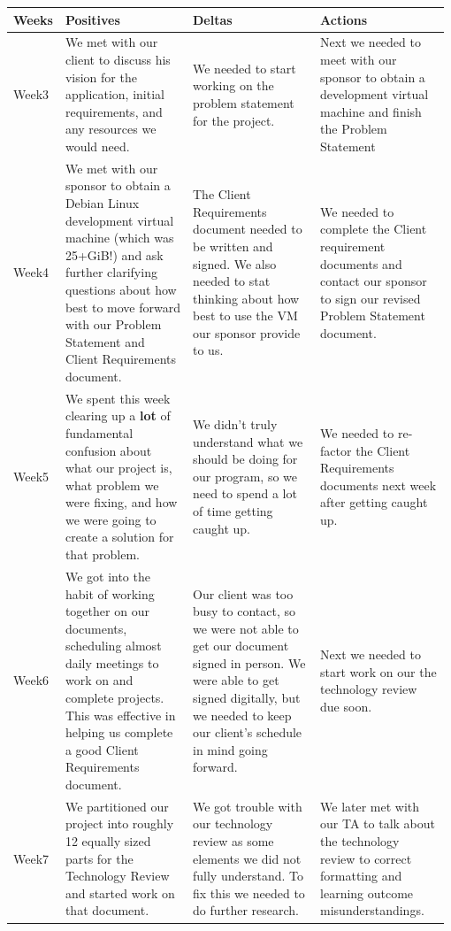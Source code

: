 \begin{longtable}{ | p{0.075\linewidth} | p{0.3\linewidth} | p{0.3\linewidth} | p{0.3\linewidth} |} \hline
  Weeks & Positives & Deltas & Actions \\ \hline
  	Week3 &
    We met with our client to discuss his vision for the application, initial requirements, and any resources we would need. &
    We needed to start working on the problem statement for the project. &
    Next we needed to meet with our sponsor to obtain a development virtual machine and finish the Problem Statement \\
  \hline
  	Week4 &
    We met with our sponsor to obtain a Debian Linux development virtual machine (which was 25+GiB!) and ask further clarifying questions about how best to move forward with our Problem Statement and Client Requirements document. &
    The Client Requirements document needed to be written and signed. We also needed to stat thinking about how best to use the VM our sponsor provide to us. &
    We needed to complete the Client requirement documents and contact our sponsor to sign our revised Problem Statement document.\\
  \hline
  	Week5 &
    We spent this week clearing up a \textbf{lot} of fundamental confusion about what our project is, what problem we were fixing, and how we were going to create a solution for that problem. &
    We didn't truly understand what we should be doing for our program, so we need to spend a lot of time getting caught up. &
    We needed to re-factor the Client Requirements documents next week after getting caught up. 
    \\
  \hline
  	Week6 &
  	We got into the habit of working together on our documents, scheduling almost daily meetings to work on and complete projects. This was effective in helping us complete a good Client Requirements document.&
    Our client was too busy to contact, so we were not able to get our document signed in person. We were able to get signed digitally, but we needed to keep our client's schedule in mind going forward.&
  	Next we needed to start work on our the technology review due soon. \\
  \hline
  	Week7 &
  	We partitioned our project into roughly 12 equally sized parts for the Technology Review and started work on that document. &
  	We got trouble with our technology review as some elements we did not fully understand. To fix this we needed to do further research. &
  	We later met with our TA to talk about the technology review to correct formatting and learning outcome misunderstandings. \\

\end{longtable}
